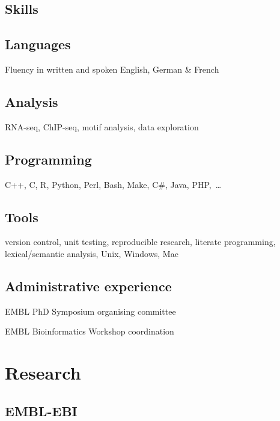 \documentclass{klmr-cv}
\newcommand*\csharp{C\#}
\newcommand*\cpp{C++}
\begin{document}
\begin{sidebar}
\section{Skills}

\subsection{Languages}

\item{Fluency in written and spoken English, German \& French}

\subsection{Analysis}

\item{RNA-seq, ChIP-seq, motif analysis, data exploration}

\subsection{Programming}

\item{\cpp, C, R, Python, Perl, Bash, Make, \csharp, Java, PHP,~…}

\subsection{Tools}

\item{version control, unit testing, reproducible research, literate
    programming, lexical/semantic analysis, Unix, Windows, Mac}

\subsection{Administrative experience}

\item{EMBL PhD Symposium organising committee}
\item{EMBL Bioinformatics Workshop coordination}
\end{sidebar}

\section{Research}

\subsection{EMBL-EBI}
\end{document}
